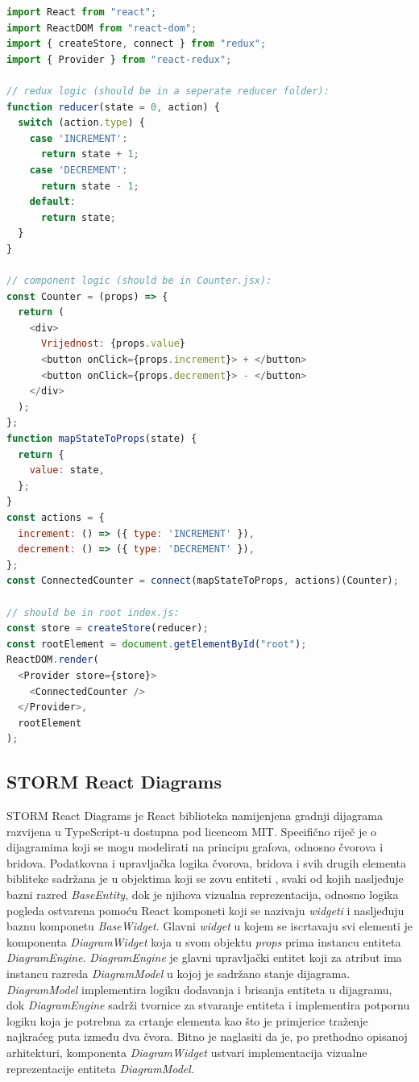 \documentclass[times, utf8, diplomski, numeric]{fer}
\newcommand{\razmakp}{\vspace{18pt}}
\newcommand{\razmaks}{\vspace{10pt}}
\begin{document}
\razmakp %
\begin{lstlisting}[language=JavaScript, caption={Primjer korištenja Redux biblioteke u React aplikaciji}, label={lst:redux}]
import React from "react";
import ReactDOM from "react-dom";
import { createStore, connect } from "redux";
import { Provider } from "react-redux";

// redux logic (should be in a seperate reducer folder):
function reducer(state = 0, action) {
  switch (action.type) {
    case 'INCREMENT':
      return state + 1;
    case 'DECREMENT':
      return state - 1;
    default:
      return state;
  }
}

// component logic (should be in Counter.jsx):
const Counter = (props) => {
  return (
    <div>
      Vrijednost: {props.value}
      <button onClick={props.increment}> + </button>
      <button onClick={props.decrement}> - </button>
    </div>
  );
};
function mapStateToProps(state) {
  return {
    value: state,
  };
}
const actions = {
  increment: () => ({ type: 'INCREMENT' }),
  decrement: () => ({ type: 'DECREMENT' }),
};
const ConnectedCounter = connect(mapStateToProps, actions)(Counter);

// should be in root index.js:
const store = createStore(reducer);
const rootElement = document.getElementById("root");
ReactDOM.render(
  <Provider store={store}>
    <ConnectedCounter />
  </Provider>,
  rootElement
);
\end{lstlisting}
\razmaks


\newpage
\subsection{STORM React Diagrams} \label{sec:storm}

STORM React Diagrams je React biblioteka namijenjena gradnji dijagrama razvijena u TypeScript-u dostupna pod licencom MIT.
Specifično riječ je o dijagramima koji se mogu modelirati na principu grafova, odnosno čvorova i bridova.
Podatkovna i upravljačka logika čvorova, bridova i svih drugih elementa bibliteke sadržana je u objektima koji se zovu entiteti , svaki od kojih nasljeđuje bazni razred \emph{BaseEntity}, dok je njihova vizualna reprezentacija, odnosno logika pogleda  ostvarena pomoću React komponeti koji se nazivaju \emph{widgeti} i nasljeđuju baznu komponetu \emph{BaseWidget}.
Glavni \emph{widget} u kojem se iscrtavaju svi elementi je komponenta \emph{DiagramWidget} koja u svom objektu \emph{props} prima instancu entiteta \emph{DiagramEngine}.
\emph{DiagramEngine} je glavni upravljački entitet koji za atribut ima instancu razreda \emph{DiagramModel} u kojoj je sadržano stanje dijagrama.
\emph{DiagramModel} implementira logiku dodavanja i brisanja entiteta u dijagramu, dok \emph{DiagramEngine} sadrži tvornice  za stvaranje entiteta i implementira potpornu logiku koja je potrebna za crtanje elementa kao što je primjerice traženje najkraćeg puta između dva čvora.
Bitno je naglasiti da je, po prethodno opisanoj arhitekturi, komponenta \emph{DiagramWidget} ustvari implementacija vizualne reprezentacije entiteta \emph{DiagramModel}.
\end{document}

